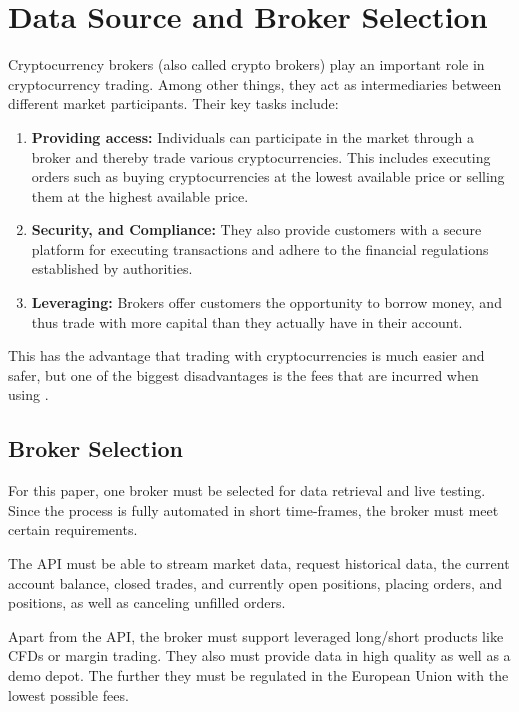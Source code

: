 \section{Data Source and Broker Selection}

Cryptocurrency brokers (also called crypto brokers) play an important role in cryptocurrency trading.
Among other things, they act as intermediaries between different market participants.
Their key tasks include:

\begin{enumerate}
    \item \textbf{Providing access:} Individuals can participate in the market through a broker and thereby trade various cryptocurrencies.
    This includes executing orders such as buying cryptocurrencies at the lowest available price or selling them at the highest available price.
    \item \textbf{Security, and Compliance:} They also provide customers with a secure platform for executing transactions and adhere to the financial regulations established by authorities.
    \item \textbf{Leveraging:} Brokers offer customers the opportunity to borrow money, and thus trade with more capital than they actually have in their account.
\end{enumerate}


This has the advantage that trading with cryptocurrencies is much easier and safer, but one of the biggest disadvantages is the fees that are incurred when using \cite{broker-investing}.

\subsection{Broker Selection}
\label{chap:broker-selection}

For this paper, one broker must be selected for data retrieval and live testing.
Since the process is fully automated in short time-frames, the broker must meet certain requirements.

The API must be able to stream market data, request historical data, the current account balance, closed trades, and currently open positions, placing orders, and positions, as well as canceling unfilled orders.

Apart from the API, the broker must support leveraged long/short products like CFDs or margin trading.
They also must provide data in high quality as well as a demo depot.
The further they must be regulated in the European Union with the lowest possible fees.

